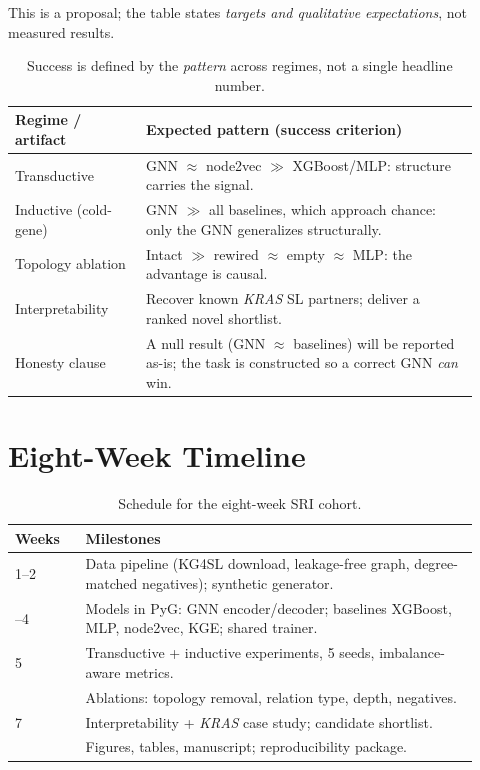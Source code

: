 \documentclass[11pt]{article}
\begin{document}
This is a proposal; the table states \emph{targets and qualitative
expectations}, not measured results.

\begin{table}[h]
\centering
\small
\begin{tabular}{>{\raggedright\arraybackslash}p{0.26\linewidth} >{\raggedright\arraybackslash}p{0.66\linewidth}}
\toprule
\rowcolor{sriblue}\color{white}\textbf{Regime / artifact} & \color{white}\textbf{Expected pattern (success criterion)}\\
\midrule
\rowcolor{srirow} Transductive & GNN $\approx$ node2vec $\gg$ XGBoost/MLP: structure carries the signal.\\
Inductive (cold-gene) & GNN $\gg$ all baselines, which approach chance: only the GNN generalizes structurally.\\
\rowcolor{srirow} Topology ablation & Intact $\gg$ rewired $\approx$ empty $\approx$ MLP: the advantage is causal.\\
Interpretability & Recover known \textit{KRAS} SL partners; deliver a ranked novel shortlist.\\
\rowcolor{srirow} Honesty clause & A null result (GNN $\approx$ baselines) will be reported as-is; the task is constructed so a correct GNN \emph{can} win.\\
\bottomrule
\end{tabular}
\caption{Success is defined by the \emph{pattern} across regimes, not a single
headline number.}
\label{tab:success}
\end{table}

\section{Eight-Week Timeline}

\begin{table}[h]
\centering
\small
\begin{tabular}{>{\raggedright\arraybackslash}p{0.14\linewidth} >{\raggedright\arraybackslash}p{0.78\linewidth}}
\toprule
\rowcolor{sriblue}\color{white}\textbf{Weeks} & \color{white}\textbf{Milestones}\\
\midrule
\rowcolor{srirow} 1--2 & Data pipeline (KG4SL download, leakage-free graph, degree-matched negatives); synthetic generator.\\
3--4 & Models in PyG: GNN encoder/decoder; baselines XGBoost, MLP, node2vec, KGE; shared trainer.\\
\rowcolor{srirow} 5 & Transductive + inductive experiments, 5 seeds, imbalance-aware metrics.\\
6 & Ablations: topology removal, relation type, depth, negatives.\\
\rowcolor{srirow} 7 & Interpretability + \textit{KRAS} case study; candidate shortlist.\\
8 & Figures, tables, manuscript; reproducibility package.\\
\bottomrule
\end{tabular}
\caption{Schedule for the eight-week SRI cohort.}
\label{tab:timeline}
\end{table}
\end{document}

